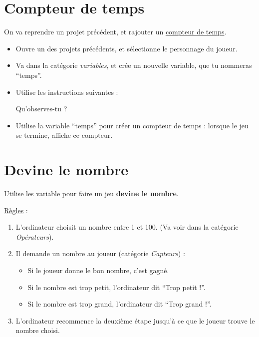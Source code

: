 \documentclass[a4paper,12pt]{article}
\newcommand{\racineDeDeux}{1.41421}
\newcommand{\blockHeight}{0.9}
\newcommand{\blockWidth}{9}
\newcommand{\clipPosition}{1.5}
\newcommand{\clipHeight}{0.15}
\newcommand{\arcStartRadius}{2}
\newcounter{codeBlockCounter}
\newcounter{codeBlockCounterBinary}
\newcommand{\startInstruction}[1]{
	\coordinate (BlockStart) at (0,-\thecodeBlockCounter*\blockHeight);
	\ifthenelse{\equal{\thecodeBlockCounterBinary}{0}}{
		\addtocounter{codeBlockCounterBinary}{1}
		\draw[fill=block1] (BlockStart)
			arc (135:45:\arcStartRadius)
			-- ++(\blockWidth-\arcStartRadius*\racineDeDeux,0)
			-- ++(0,-\blockHeight)
			-- ++(-\blockWidth+\clipPosition+2.5*\clipHeight,0)
			-- ++(-\clipHeight,-\clipHeight)
			-- ++(-\clipHeight/2,0)
			-- ++(-\clipHeight,\clipHeight)
			-- ++(-\clipPosition,0)
			-- ++(0,\blockHeight);
	}{
		\addtocounter{codeBlockCounterBinary}{-1}
		\draw[fill=block2] (BlockStart)
			arc (135:45:\arcStartRadius)
			-- ++(\blockWidth-\arcStartRadius*\racineDeDeux,0)
			-- ++(0,-\blockHeight)
			-- ++(-\blockWidth+\clipPosition+2.5*\clipHeight,0)
			-- ++(-\clipHeight,-\clipHeight)
			-- ++(-\clipHeight/2,0)
			-- ++(-\clipHeight,\clipHeight)
			-- ++(-\clipPosition,0)
			-- ++(0,\blockHeight);
	}
	\node[anchor=west] at (0.5,-\thecodeBlockCounter*\blockHeight - \blockHeight/2) {#1};
	\addtocounter{codeBlockCounter}{1}
}
\newcommand{\instruction}[1]{
	\coordinate (BlockStart) at (0,-\thecodeBlockCounter*\blockHeight);
	\ifthenelse{\equal{\thecodeBlockCounterBinary}{0}}{
		\addtocounter{codeBlockCounterBinary}{1}
		\draw[fill=block1] (BlockStart)
			-- ++(\clipPosition,0)
			-- ++(\clipHeight,-\clipHeight)
			-- ++(\clipHeight/2,0)
			-- ++(\clipHeight,\clipHeight)
			-- ++(\blockWidth-\clipPosition-2.5*\clipHeight,0)
			-- ++(0,-\blockHeight)
			-- ++(-\blockWidth+\clipPosition+2.5*\clipHeight,0)
			-- ++(-\clipHeight,-\clipHeight)
			-- ++(-\clipHeight/2,0)
			-- ++(-\clipHeight,\clipHeight)
			-- ++(-\clipPosition,0)
			-- ++(0,\blockHeight);
	}{
		\addtocounter{codeBlockCounterBinary}{-1}
		\draw[fill=block2] (BlockStart)
			-- ++(\clipPosition,0)
			-- ++(\clipHeight,-\clipHeight)
			-- ++(\clipHeight/2,0)
			-- ++(\clipHeight,\clipHeight)
			-- ++(\blockWidth-\clipPosition-2.5*\clipHeight,0)
			-- ++(0,-\blockHeight)
			-- ++(-\blockWidth+\clipPosition+2.5*\clipHeight,0)
			-- ++(-\clipHeight,-\clipHeight)
			-- ++(-\clipHeight/2,0)
			-- ++(-\clipHeight,\clipHeight)
			-- ++(-\clipPosition,0)
			-- ++(0,\blockHeight);
	}
	\node[anchor=west] at (0.5,-\thecodeBlockCounter*\blockHeight - \blockHeight/2) {#1};
	\addtocounter{codeBlockCounter}{1}
}
\begin{document}
\maketitle

\section*{Compteur de temps}

On va reprendre un projet précédent, et rajouter un \uline{compteur de temps}.

\begin{itemize}
	\item Ouvre un des projets précédents, et sélectionne le personnage du joueur.
	\item Va dans la catégorie \textit{variables}, et crée un nouvelle variable, que tu nommeras “temps”.
	\item Utilise les instructions suivantes :

	      \begin{center}
	      \end{center}


	      Qu'observes-tu ? \dotfill
	\item Utilise la variable “temps” pour créer un compteur de temps : lorsque le jeu se termine, affiche ce compteur.
\end{itemize}

\section*{Devine le nombre}

Utilise les variable pour faire un jeu \textbf{devine le nombre}.

\uline{Règles} :
\begin{enumerate}
	\item L'ordinateur choisit un nombre entre 1 et 100. (Va voir dans la catégorie \textit{Opérateurs}).
	\item Il demande un nombre au joueur (catégorie \textit{Capteurs}) :
	      \begin{itemize}
		      \item Si le joueur donne le bon nombre, c'est gagné.
		      \item Si le nombre est trop petit, l'ordinateur dit “Trop petit !”.
		      \item Si le nombre est trop grand, l'ordinateur dit “Trop grand !”.
	      \end{itemize}
	\item L'ordinateur recommence la deuxième étape jusqu'à ce que le joueur trouve le nombre choisi.
\end{enumerate}
\end{document}
